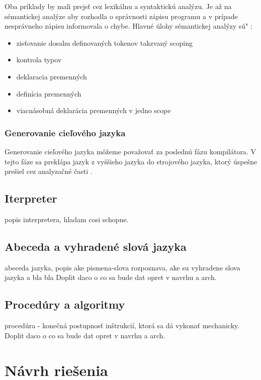 Oba príklady by mali prejsť cez lexikálnu a syntaktickú analýzu. Je až na sémantickej analýze aby rozhodla o správnosti zápisu programu a v prípade nesprávneho zápisu informovala o chybe.  Hlavné úlohy sémantickej analýzy sú" :

\begin{itemize}
	\item zisťovanie dosahu definovaných tokenov takzvaný scoping
	\item kontrola typov
	\item deklaracia premenných
	\item definícia premenných
	\item viacnásobná deklarácia premenných v jedno scope
\end{itemize}

\subsubsection{Generovanie cieľového jazyka}
\indent Generovanie cieľového jazyka môžeme považovať za poslednú fázu kompilátora. V tejto fáze sa preklápa jazyk z vyššieho jazyka do strojového jazyka, ktorý úspešne prešiel cez analyzačné časti .

\subsection{Iterpreter}
\indent popis interpretera, hladam cosi schopne.

\subsection{Abeceda a vyhradené slová jazyka}
abeceda jazyka, popis ake pismena-slova rozpoznava, ake su vyhradene slova jazyka a bla bla
Doplit daco o co sa bude dat opret v navrhu a arch.

\subsection{Procedúry a algoritmy}
procedúra - konečná postupnosť inštrukcií, ktorá sa dá vykonať mechanicky. Doplit daco o co sa bude dat opret v navrhu a arch.

\section{Návrh riešenia}
\indent 
